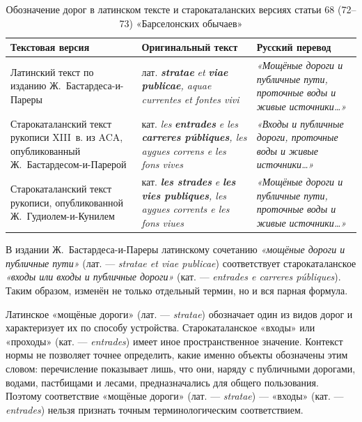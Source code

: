 \begin{center}
\small
\setlength{\tabcolsep}{2pt}
\begin{longtable}{|p{}|p{}|p{}|}
\caption{Обозначение дорог в латинском тексте и старокаталанских версиях статьи 68 (72--73) «Барселонских обычаев»}\label{tab:ch2-roads}\\
\hline
\textbf{Текстовая версия} & \textbf{Оригинальный текст} & \textbf{Русский перевод} \\ \hline
Латинский текст по изданию Ж.~Бастардеса-и-Пареры & лат. \textbf{\emph{stratae}}\emph{ et }\textbf{\emph{viae publicae}}\emph{, aquae currentes et fontes vivi} & \emph{«Мощёные дороги и публичные пути, проточные воды и живые источники…»} \\ \hline
Старокаталанский текст рукописи XIII~в. из ACA, опубликованный Ж.~Бастардесом-и-Парерой & кат. \emph{les }\textbf{\emph{entrades}}\emph{ e les }\textbf{\emph{carreres públiques}}\emph{, les aygues correns e les fons vives} & \emph{«Входы и публичные дороги, проточные воды и живые источники…»} \\ \hline
Старокаталанский текст рукописи, опубликованной Ж.~Гудиолем-и-Кунилем & кат. \textbf{\emph{les strades}}\emph{ e }\textbf{\emph{les vies publiques}}\emph{, les aygues corrents e les fons viues} & \emph{«Мощёные дороги и публичные пути, проточные воды и живые источники…»} \\ \hline
\end{longtable}
\end{center}

В издании Ж.~Бастардеса-и-Пареры латинскому сочетанию \emph{«мощёные дороги и публичные пути»} (лат. --- \emph{stratae et viae publicae}) соответствует старокаталанское \emph{«входы или входы и публичные дороги»} (кат. --- \emph{entrades e carreres públiques}). Таким образом, изменён не только отдельный термин, но и вся парная формула.

Латинское «мощёные дороги» (лат. --- \emph{stratae}) обозначает один из видов дорог и характеризует их по способу устройства. Старокаталанское «входы» или «проходы» (кат. --- \emph{entrades}) имеет иное пространственное значение. Контекст нормы не позволяет точнее определить, какие именно объекты обозначены этим словом: перечисление показывает лишь, что они, наряду с публичными дорогами, водами, пастбищами и лесами, предназначались для общего пользования. Поэтому соответствие «мощёные дороги» (лат. --- \emph{stratae}) --- «входы» (кат. --- \emph{entrades}) нельзя признать точным терминологическим соответствием.

